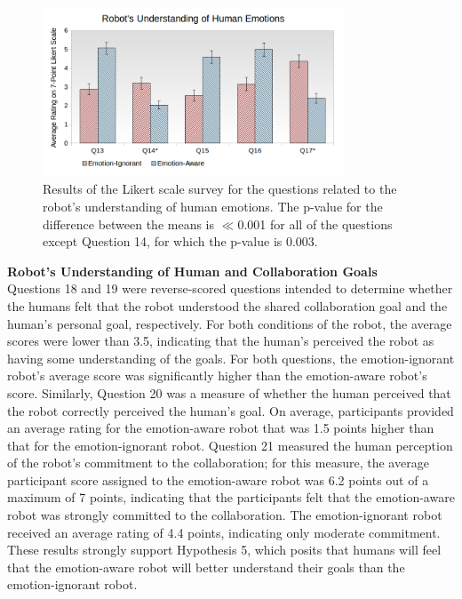 \documentclass[12pt]{report}
\begin{document}
\begin{figure}[tbh]
\centering
\includegraphics[width=0.8\textwidth]{figure/Overall-Emotions.png}
\vspace*{-5mm}
\caption{Results of the Likert scale survey for the questions related to the
robot's understanding of human emotions. The p-value for the difference between
the means is $\ll$0.001 for all of the questions except Question 14, for which
the p-value is 0.003.}
\label{fig:overall-emotions}
\end{figure}

\hspace*{-8mm} \textbf{Robot's Understanding of Human and Collaboration Goals}
\label{sec:Goals}
\\Questions 18 and 19 were reverse-scored questions intended to determine
whether the humans felt that the robot understood the shared collaboration goal and the
human's personal goal, respectively. For both conditions of the robot, the
average scores were lower than 3.5, indicating that the human's perceived the
robot as having some understanding of the goals. For both questions, the
emotion-ignorant robot's average score was significantly higher than the
emotion-aware robot's score. Similarly, Question 20 was a measure of whether the
human perceived that the robot correctly perceived the human's goal.
On average, participants provided an average rating for the emotion-aware robot
that was 1.5 points higher than that for the emotion-ignorant robot. Question 21
measured the human perception of the robot's commitment to the collaboration;
for this measure, the average participant score assigned to the emotion-aware
robot was 6.2 points out of a maximum of 7 points, indicating that the
participants felt that the emotion-aware robot was strongly committed to the
collaboration. The emotion-ignorant robot received an average rating of 4.4
points, indicating only moderate commitment. These results strongly support
Hypothesis 5, which posits that humans will feel that the emotion-aware robot
will better understand their goals than the emotion-ignorant robot.\\
\end{document}

